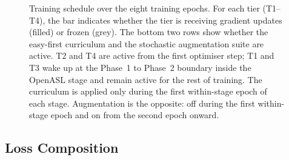 \documentclass{article}
\begin{document}
\begin{figure}[h]
\caption{Training schedule over the eight training epochs. For each tier
(T1--T4), the bar indicates whether the tier is receiving gradient updates
(filled) or frozen (grey). The bottom two rows show whether the easy-first
curriculum and the stochastic augmentation suite are active. T2 and T4 are
active from the first optimiser step; T1 and T3 wake up at the Phase~1 to
Phase~2 boundary inside the OpenASL stage and remain active for the rest of
training. The curriculum is applied only during the first within-stage
epoch of each stage. Augmentation is the opposite: off during the first
within-stage epoch and on from the second epoch onward.}
\label{fig:tier-timeline}
\end{figure}

\subsection{Loss Composition}
\label{sec:train-loss}
\end{document}

